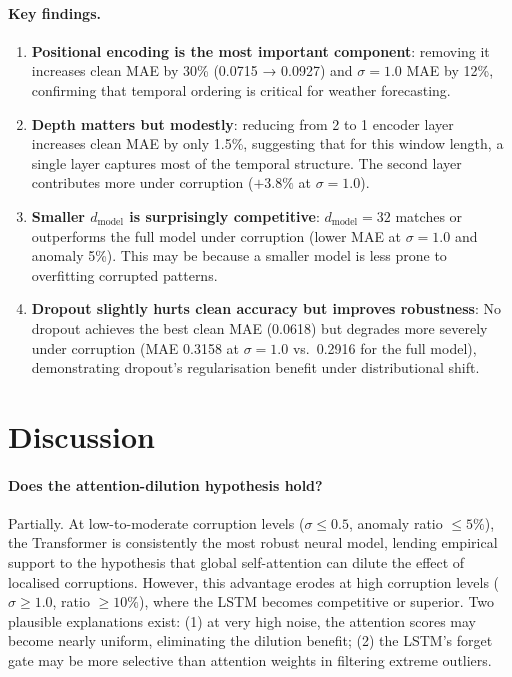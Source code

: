 \documentclass[runningheads]{llncs}
\begin{document}
\paragraph{Key findings.}
\begin{enumerate}
  \item \textbf{Positional encoding is the most important component}: removing it increases clean MAE by 30\% (0.0715 → 0.0927) and $\sigma=1.0$ MAE by 12\%, confirming that temporal ordering is critical for weather forecasting.
  \item \textbf{Depth matters but modestly}: reducing from 2 to 1 encoder layer increases clean MAE by only 1.5\%, suggesting that for this window length, a single layer captures most of the temporal structure. The second layer contributes more under corruption ($+3.8\%$ at $\sigma=1.0$).
  \item \textbf{Smaller $d_\text{model}$ is surprisingly competitive}: $d_\text{model}=32$ matches or outperforms the full model under corruption (lower MAE at $\sigma=1.0$ and anomaly 5\%). This may be because a smaller model is less prone to overfitting corrupted patterns.
  \item \textbf{Dropout slightly hurts clean accuracy but improves robustness}: No dropout achieves the best clean MAE (0.0618) but degrades more severely under corruption (MAE 0.3158 at $\sigma=1.0$ vs.\ 0.2916 for the full model), demonstrating dropout's regularisation benefit under distributional shift.
\end{enumerate}

\section{Discussion}
\label{sec:discussion}

\paragraph{Does the attention-dilution hypothesis hold?}
Partially. At low-to-moderate corruption levels ($\sigma \leq 0.5$, anomaly ratio $\leq 5\%$), the Transformer is consistently the most robust neural model, lending empirical support to the hypothesis that global self-attention can dilute the effect of localised corruptions. However, this advantage erodes at high corruption levels ($\sigma \geq 1.0$, ratio $\geq 10\%$), where the LSTM becomes competitive or superior. Two plausible explanations exist: (1) at very high noise, the attention scores may become nearly uniform, eliminating the dilution benefit; (2) the LSTM's forget gate may be more selective than attention weights in filtering extreme outliers.
\end{document}
